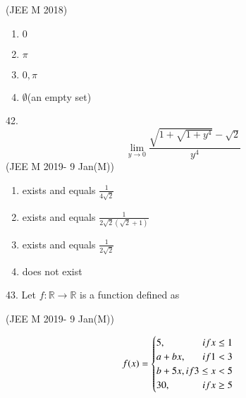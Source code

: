 \documentclass[journal,12pt,twocolumn]{IEEEtran}
\theoremstyle{remark}
\begin{document}
\hfill{(JEE M 2018)}
\begin{enumerate}[label=(\alph*)]
\item {$0$}
\item ${\pi}$
\item ${0,\pi}$
\item ${\emptyset}$(an empty set) 
\end{enumerate}
42.  
\[\lim_{y\to0} \frac{\sqrt{1+\sqrt{1+y^4}}-\sqrt{2}}{y^4} \]
\hfill{(JEE M 2019- 9 Jan(M))}
\begin{enumerate}[label=(\alph*)]
\item exists and equals $\frac{1}{4\sqrt{2}}$
\item exists and equals $\frac{1}{2\sqrt{2}(\sqrt{2}+1)}$
\item exists and equals $\frac{1}{2\sqrt{2}}$
\item does not exist
\end{enumerate}
43. Let $f : \mathbb{R}\to\mathbb{R}$ is a function defined as

\hfill{(JEE M 2019- 9 Jan(M))}

\begin{equation}
    f(x)= 
    \begin{cases}
    5, \hfill{if x \le 1}\\
    a + bx, \hfill{if 1 < 3}\\
    b + 5x, \hfill{if 3 \le x < 5}\\
    30, \hfill{if x \ge 5}
    \end{cases}
\end{equation}
\end{document}
